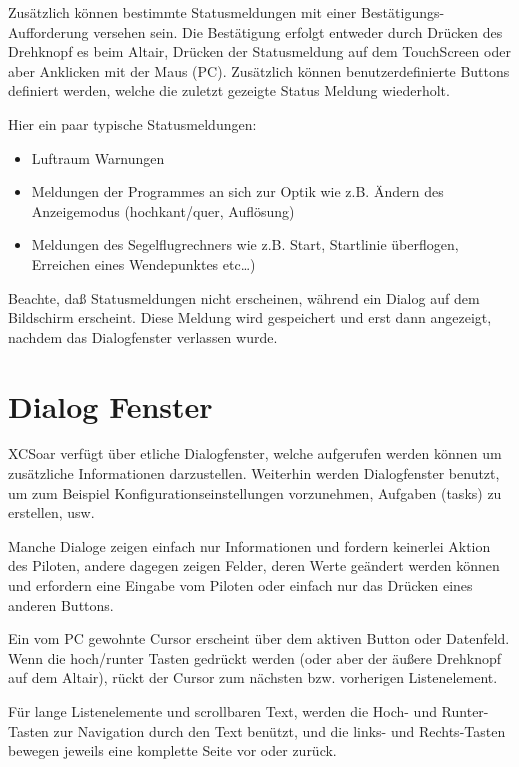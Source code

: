 Zusätzlich können bestimmte Statusmeldungen mit einer Bestätigungs-Aufforderung versehen sein.
Die Bestätigung erfolgt entweder durch Drücken des Drehknopf es beim \textsf{Altair}, Drücken der Statusmeldung auf dem TouchScreen oder aber Anklicken mit der Maus (\textsf{PC}).  Zusätzlich können benutzerdefinierte Buttons definiert werden, welche die zuletzt gezeigte Status Meldung wiederholt.

Hier ein paar typische Statusmeldungen:
\begin{itemize}
\item Luftraum Warnungen
\item Meldungen der Programmes an sich zur Optik wie z.B. Ändern des Anzeigemodus (hochkant/quer, Auflösung)
\item Meldungen des Segelflugrechners wie z.B. Start, Startlinie überflogen, Erreichen eines Wendepunktes etc\dots  )
\end{itemize}

Beachte, daß Statusmeldungen nicht erscheinen, während ein Dialog auf dem Bildschirm erscheint. Diese Meldung wird gespeichert und erst dann angezeigt, nachdem das Dialogfenster verlassen wurde.

\section{Dialog Fenster}\label{sec:dialog-windows}

\textsf{XCSoar} verfügt über etliche Dialogfenster, welche aufgerufen werden können um zusätzliche Informationen darzustellen. Weiterhin werden Dialogfenster benutzt, um zum Beispiel Konfigurationseinstellungen vorzunehmen, Aufgaben (tasks) zu erstellen, usw.\

Manche Dialoge zeigen einfach nur Informationen und fordern keinerlei Aktion des Piloten, andere dagegen zeigen Felder, deren Werte geändert werden können und erfordern eine Eingabe vom Piloten oder einfach nur das Drücken eines anderen Buttons.

Ein vom \textsf{PC} gewohnte Cursor erscheint über dem aktiven Button oder Datenfeld.
Wenn die hoch/runter Tasten gedrückt werden (oder aber der äußere Drehknopf auf dem \textsf{Altair}), rückt der Cursor zum nächsten bzw. vorherigen Listenelement.

Für lange Listenelemente und scrollbaren Text, werden die Hoch- und Runter-Tasten zur Navigation durch den Text benützt, und die links- und Rechts-Tasten bewegen jeweils eine komplette Seite vor oder zurück.

